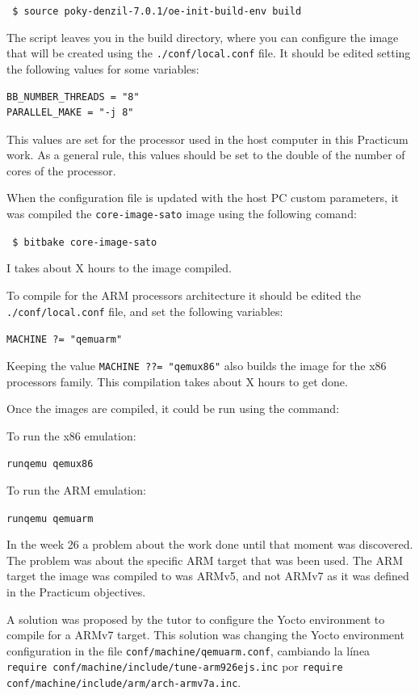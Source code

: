 \documentclass[a4paper,11pt,openany]{report}
\begin{document}
\verb# $ source poky-denzil-7.0.1/oe-init-build-env build #

The script leaves you in the build directory, where you can configure the image that will be created using the \verb#./conf/local.conf# file. It should be edited setting the following values for some variables:

\begin{verbatim}
BB_NUMBER_THREADS = "8"
PARALLEL_MAKE = "-j 8"
\end{verbatim}

This values are set for the processor used in the host computer in this Practicum work. As a general rule, this values should be set to the double of the number of cores of the processor.

When the configuration file is updated with the host PC custom parameters, it was compiled the \verb#core-image-sato# image using the following comand:

\verb# $ bitbake core-image-sato #

I takes about X hours to the image compiled.

To compile for the ARM processors architecture it should be edited the \verb#./conf/local.conf# file, and set the following variables:

\verb#MACHINE ?= "qemuarm"#

Keeping the value \verb#MACHINE ??= "qemux86"# also builds the image for the x86 processors family. This compilation takes about X hours to get done.

Once the images are compiled, it could be run using the command:

To run the x86 emulation:

\verb#runqemu qemux86#

To run the ARM emulation:

\verb#runqemu qemuarm#

In the week 26 a problem about the work done until that moment was discovered. The problem was about the specific ARM target that was been used. The ARM target the image was compiled to was ARMv5, and not ARMv7 as it was defined in the Practicum objectives.

A solution was proposed by the tutor to configure the Yocto environment to compile for a ARMv7 target. This solution was changing the Yocto environment configuration in the file \verb#conf/machine/qemuarm.conf#, cambiando la línea \verb#require conf/machine/include/tune-arm926ejs.inc# por \verb#require conf/machine/include/arm/arch-armv7a.inc#.
\end{document}
